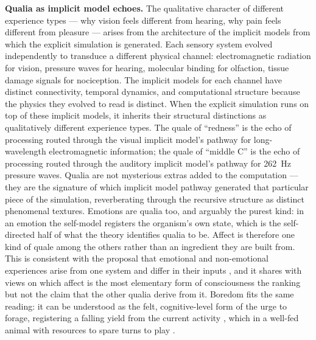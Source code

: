 \documentclass[12pt]{article}
\begin{document}
{\textbf{Qualia as implicit model echoes.} The qualitative character of different experience types --- why vision feels different from hearing, why pain feels different from pleasure --- arises from the architecture of the implicit models from which the explicit simulation is generated. Each sensory system evolved independently to transduce a different physical channel: electromagnetic radiation for vision, pressure waves for hearing, molecular binding for olfaction, tissue damage signals for nociception. The implicit models for each channel have distinct connectivity, temporal dynamics, and computational structure because the physics they evolved to read is distinct. When the explicit simulation runs on top of these implicit models, it inherits their structural distinctions as qualitatively different experience types. The quale of ``redness'' is the echo of processing routed through the visual implicit model's pathway for long-wavelength electromagnetic information; the quale of ``middle C'' is the echo of processing routed through the auditory implicit model's pathway for 262~Hz pressure waves. Qualia are not mysterious extras added to the computation --- they are the signature of which implicit model pathway generated that particular piece of the simulation, reverberating through the recursive structure as distinct phenomenal textures. Emotions are qualia too, and arguably the purest kind: in an emotion the self-model registers the organism's own state, which is the self-directed half of what the theory identifies qualia to be. Affect is therefore one kind of quale among the others rather than an ingredient they are built from. This is consistent with the proposal that emotional and non-emotional experiences arise from one system and differ in their inputs \citep{LeDouxBrown2017}, and it shares with views on which affect is the most elementary form of consciousness \citep{Panksepp2005,Solms2021} the ranking but not the claim that the other qualia derive from it. Boredom fits the same reading: it can be understood as the felt, cognitive-level form of the urge to forage, registering a falling yield from the current activity \citep{Hills2006,Hills2015,Agrawal2022}, which in a well-fed animal with resources to spare turns to play \citep{Burghardt2005}.

}
\end{document}
